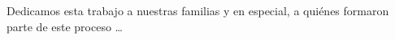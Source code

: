 \begin{dedicatoria} 

Dedicamos esta trabajo a nuestras familias y en especial, a quiénes formaron parte de este proceso \dots

\end{dedicatoria}